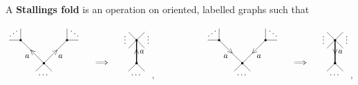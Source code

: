 A \textbf{Stallings fold} is an operation on oriented, labelled graphs such that
$$
\begin{tikzpicture}
\fill (0, 0) circle (0.05);
\fill (-1, 1) circle (0.05);
\fill (1, 1) circle (0.05);
\draw (0, 0) to (-0.35, -0.35);
\draw (0, -0.5) node{$ \dots $};
\draw (0, 0) to (0.35, -0.35);
\draw (-1, 1) to (-1.5, 1);
\draw (-1, 1) node[above left]{$ \iddots $};
\draw (-1, 1) to (-1, 1.5);
\draw (1, 1) to (1, 1.5);
\draw (1, 1) node[above right]{$ \ddots $};
\draw (1, 1) to (1.5, 1);
\draw (0, 0) to node{\rotatebox{45}{$ \wedge $}} node[below left]{$ a $} (-1, 1);
\draw (0, 0) to node{\rotatebox{45}{$ > $}} node[below right]{$ a $} (1, 1);
\draw (2.5, 0) node{$ \implies $};
\fill (4, 0) circle (0.05);
\fill (4, 1) circle (0.05);
\draw (4, 0) to (3.65, -0.35);
\draw (4, -0.5) node{$ \dots $};
\draw (4, 0) to (4.35, -0.35);
\draw (4, 1) to (3.65, 0.65);
\draw (3.5, 1.5) node[below]{$ \vdots $};
\draw (4, 1) to (3.65, 1.35);
\draw (4, 1) to (4.35, 1.35);
\draw (4.5, 1.5) node[below]{$ \vdots $};
\draw (4, 1) to (4.35, 0.65);
\draw [very thick] (4, 0) to node{$ \wedge $} node[right]{$ a $} (4, 1);
\end{tikzpicture},
\qquad \qquad \qquad
\begin{tikzpicture}
\fill (0, 0) circle (0.05);
\fill (-1, 1) circle (0.05);
\fill (1, 1) circle (0.05);
\draw (0, 0) to (-0.35, -0.35);
\draw (0, -0.5) node{$ \dots $};
\draw (0, 0) to (0.35, -0.35);
\draw (-1, 1) to (-1.5, 1);
\draw (-1, 1) node[above left]{$ \iddots $};
\draw (-1, 1) to (-1, 1.5);
\draw (1, 1) to (1, 1.5);
\draw (1, 1) node[above right]{$ \ddots $};
\draw (1, 1) to (1.5, 1);
\draw (-1, 1) to node{\rotatebox{45}{$ \vee $}} node[below left]{$ a $} (0, 0);
\draw (1, 1) to node{\rotatebox{45}{$ < $}} node[below right]{$ a $} (0, 0);
\draw (2.5, 0) node{$ \implies $};
\fill (4, 0) circle (0.05);
\fill (4, 1) circle (0.05);
\draw (4, 0) to (3.65, -0.35);
\draw (4, -0.5) node{$ \dots $};
\draw (4, 0) to (4.35, -0.35);
\draw (4, 1) to (3.65, 0.65);
\draw (3.5, 1.5) node[below]{$ \vdots $};
\draw (4, 1) to (3.65, 1.35);
\draw (4, 1) to (4.35, 1.35);
\draw (4.5, 1.5) node[below]{$ \vdots $};
\draw (4, 1) to (4.35, 0.65);
\draw [very thick] (4, 1) to node{$ \vee $} node[right]{$ a $} (4, 0);
\end{tikzpicture},
$$
